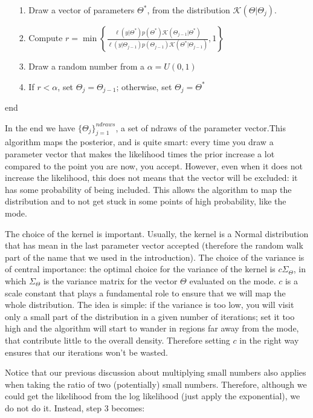 \documentclass[12pt,a4paper]{article}
\begin{document}
\begin{itemize}
\item[1. ] Draw a vector of parameters $\Theta^{*}$, from the distribution $\mathcal{K}(\Theta|\Theta_j)$.


\item[2. ] Compute $r = \min\left\{\frac{\ell(y|\Theta^*)p(\Theta^*)\mathcal{K}(\Theta_{j-1}|\Theta^*)}{\ell(y|\Theta_{j-1})p(\Theta_{j-1})\mathcal{K}(\Theta^*|\Theta_{j-1})},1\right\}$


\item[3. ] Draw a random number from a $\alpha = U(0,1)$


\item[4. ] If $r < \alpha$, set $\Theta_j = \Theta_{j-1}$; otherwise, set $\Theta_j = \Theta^{*}$

\end{itemize}
end

In the end we have $\{\Theta_j\}_{j=1}^{ndraws}$, a set of ndraws of the parameter vector.This algorithm maps the posterior, and is quite smart: every time you draw a parameter vector that makes the likelihood times the prior increase a lot compared to the point you are now, you accept. However, even when it does not increase the likelihood, this does not means that the vector will be excluded: it has some probability of being included. This allows the algorithm to map the distribution and to not get stuck in some points of high probability, like the mode.

The choice of the kernel is important. Usually, the kernel is a Normal distribution that has mean in the last parameter vector accepted (therefore the random walk part of the name that we used in the introduction). The choice of the variance is of central importance: the optimal choice for the variance of the kernel is $c\Sigma_\Theta$, in which $\Sigma_\Theta$ is the variance matrix for the vector $\Theta$ evaluated on the mode. $c$ is a scale constant that plays a fundamental role to ensure that we will map the whole distribution. The idea is simple: if the variance is too low, you will visit only a small part of the distribution in a given number of iterations; set it too high and the algorithm will start to wander in regions far away from the mode, that contribute little to the overall density. Therefore setting $c$ in the right way ensures that our iterations won't be wasted.

Notice that our previous discussion about multiplying small numbers also applies when taking the ratio of two (potentially) small numbers. Therefore, although we could get the likelihood from the log likelihood (just apply the exponential), we do not do it. Instead, step 3 becomes:
\end{document}
